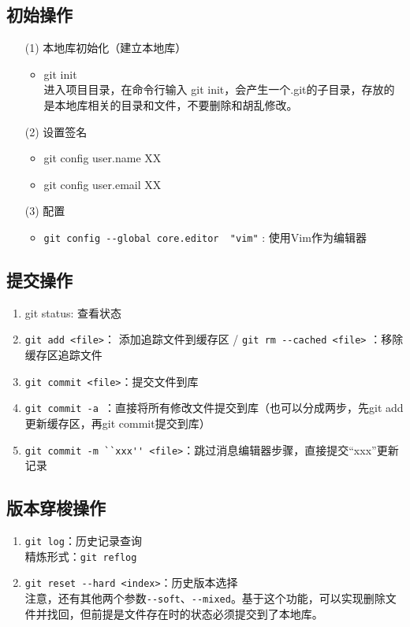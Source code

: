\documentclass[a4paper,11pt,twoside]{book}
\begin{document}
\subsection{初始操作}
\begin{itemize}
\item[(1)] 本地库初始化（建立本地库）
\begin{itemize}
\item git init\\
进入项目目录，在命令行输入 git init，会产生一个.git的子目录，存放的是本地库相关的目录和文件，不要删除和胡乱修改。
\end{itemize}

\item[(2)] 设置签名
\begin{itemize}
\item git config user.name XX
\item git config user.email XX
\end{itemize}

\item [(3)] 配置
\begin{itemize}
\item \verb|git config --global core.editor  "vim"| : 使用Vim作为编辑器
\end{itemize}

\end{itemize}



\subsection{提交操作}
\begin{enumerate}
\item git status: 查看状态
\item \verb|git add <file>|： 添加追踪文件到缓存区 / \verb|git rm --cached <file>| ：移除缓存区追踪文件
\item \verb|git commit <file>|：提交文件到库
\item \verb|git commit -a |：直接将所有修改文件提交到库（也可以分成两步，先git add更新缓存区，再git commit提交到库）
\item \verb|git commit -m ``xxx'' <file>|：跳过消息编辑器步骤，直接提交“xxx”更新记录
\end{enumerate}



\subsection{版本穿梭操作}
\begin{enumerate}
\item \verb|git log|：历史记录查询\\
精炼形式：\verb|git reflog| 

\item \verb|git reset --hard <index>|：历史版本选择\\
注意，还有其他两个参数\verb|--soft|、\verb|--mixed|。基于这个功能，可以实现删除文件并找回，但前提是文件存在时的状态必须提交到了本地库。
\end{enumerate}
\end{document}
